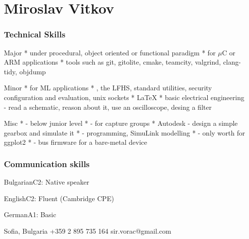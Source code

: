 \documentclass{tccv}
\begin{document}


\part{Miroslav Vitkov}


\section{Technical Skills}
\begin{factlist}
\item{Major}
{
     *  under procedural, object oriented or functional paradigm  \mynext
     *  for $\mu$C or ARM applications  \mynext
     * tools such as git, gitolite, cmake, teamcity, valgrind, clang-tidy, objdump
}
\\
\item{Minor}
{
    *  for ML applications  \mynext
    * , the LFHS, standard utilities, security configuration and evaluation, unix sockets  \mynext
    * \LaTeX  \mynext
    * basic electrical engineering - read a schematic, reason about it, use an oscilloscope, desing a filter
}
\\
\item{Misc}
{
    *  - below junior level  \mynext
    *  - for capture groups  \mynext
    * Autodesk  - design a simple gearbox and simulate it  \mynext
    *  - programming, SimuLink modelling  \mynext
    *  - only worth for ggplot2  \mynext
    *  - bus firmware for a bare-metal device
}
\end{factlist}


\section{Communication skills}
\begin{factlist}
\item{Bulgarian}{C2: Native speaker}
\item{English}{C2: Fluent (Cambridge CPE)}
\item{German}{A1: Basic}
\end{factlist}


\personal
    {Sofia, Bulgaria}
    {+359 2 895 735 164}
    {sir.vorac@gmail.com}
\end{document}
